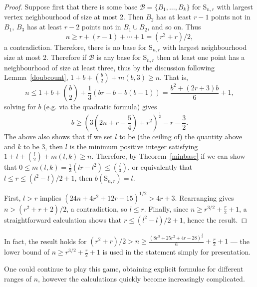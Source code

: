 \documentclass[ALCO,published]{cedram}
\renewcommand\S{\mathrm{S}}
\begin{document}
\begin{proof}
Suppose first that there is some base $\mathcal{B}=\{B_1,\dots, B_k\}$ for $\S_{n,r}$ with largest vertex neighbourhood of size at most 2. Then $B_2$ has at least $r-1$ points not in $B_1$, $B_3$ has at least $r-2$ points not in $B_1\cup B_2$, and so on. Thus $$n\geq r+(r-1)+\cdots+1=(r^2+r)/2,$$ a contradiction. Therefore, there is no base for $\S_{n,r}$ with largest neighbourhood size at most 2. Therefore if $\mathcal{B}$ is any base for $\S_{n,r}$ then at least one point has a neighbourhood of size at least three, thus by the discussion following Lemma~\ref{doubcount}, $1+b+\binom{b}{2}+m(b,3)\geq n$. That is, $$n\leq1+b+\binom{b}{2}+\frac{1}{3}(br-b-b(b-1))=\frac{b^2+(2r+3)b}{6}+1,$$ solving for $b$ (e.g. via the quadratic formula) gives $$b\geq\left(3\left(2n+r-\frac{5}{4}\right)+r^2\right)^\frac{1}{2}-r-\frac{3}{2}.$$
The above also shows that if we set $l$ to be (the ceiling of) the quantity above and $k$ to be $3$, then $l$ is the minimum positive integer satisfying $1+l+\binom{l}{2}+m(l,k)\geq n$. Therefore, by Theorem~\ref{minbase} if we can show that $0\leq m(l,k)=\frac{1}{3}(lr-l^2)\leq \binom{l}{3}$, or equivalently that $l\leq r\leq (l^2-l)/2+1$, then $b(\S_{n,r})=l$.

First, $l>r$ implies $(24n+4r^2+12r-15)^{1/2}>4r+3$. Rearranging gives \linebreak$n>(r^2+r+2)/2$, a contradiction, so $l\leq r$. Finally, since $n\geq  r^{3/2}+\frac{r}{2}+1$, a straightforward calculation shows that $r\leq (l^2-l)/2+1$, hence the result.
\end{proof}

\begin{rema}
In fact, the result holds for $(r^2+r)/2>n\geq \frac{(8r^3+25r^2+4r-28)^\frac{1}{2}}{6}+\frac{r}{2}+1$ --- the lower bound of $n\geq r^{3/2}+\frac{r}{2}+1$ is used in the statement simply for presentation.
\end{rema}

One could continue to play this game, obtaining explicit formulae for different ranges of $n$, however the calculations quickly become increasingly complicated.




\end{document}
